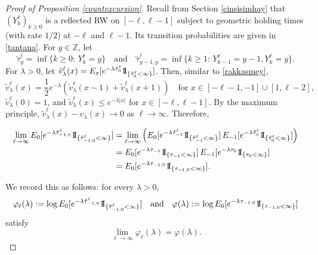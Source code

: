 \documentclass[a4paper]{amsart}
\numberwithin{equation}{section}
\theoremstyle{plain}
\theoremstyle{remark}
\begin{document}
\begin{proof}[Proof of Proposition \ref{countexcursion}]
	Recall from Section \ref{cinsisimhay} that $(Y_k^\ell)_{k\ge0}$ is a reflected RW on $[-\ell,\ell-1]$ subject to geometric holding times (with rate $1/2$) at $-\ell$ and $\ell-1$. Its transition probabilities are given in \eqref{tantana}. For $y\in\mathbb{Z}$, let
	$$\tilde\tau_y^\ell = \inf\{k\ge 0:\,Y_k^\ell = y\}\quad\text{and}\quad\tilde\tau_{y-1,y}^\ell = \inf\{k\ge1:\,Y_{k-1}^\ell = y-1, Y_k^\ell = y\}.$$
	For $\lambda > 0$, let $\tilde v_\lambda^\ell(x) = E_x[e^{-\lambda\tilde\tau_0^\ell}{{{\rm 1\mkern-1.5mu}\!{\rm I}}}_{\{\tilde\tau_{0}^\ell<\infty\}}]$. Then, similar to \eqref{rakkasmey},
	$$\tilde v_\lambda^\ell(x) = \frac1{2}e^{-\lambda}(\tilde v_\lambda^\ell(x-1) + \tilde v_\lambda^\ell(x+1))\quad\text{for $x\in[-\ell-1,-1]\cup[1,\ell-2]$,}$$
	$\tilde v_\lambda^\ell(0) = 1$, and $\tilde v_\lambda^\ell(x) \le e^{-\lambda|x|}$ for $x\in[-\ell,\ell-1]$.
	By the maximum principle, $\tilde v_\lambda^\ell(x) - v_\lambda(x)\to0$ as $\ell\to\infty$.
	Therefore,
	
	\begin{align*}
	\lim_{\ell\to\infty}E_0[e^{-\lambda\tilde\tau_{-1,0}^\ell}{{{\rm 1\mkern-1.5mu}\!{\rm I}}}_{\{\tilde\tau_{-1,0}^\ell<\infty\}}] &= \lim_{\ell\to\infty}\left(E_0[e^{-\lambda\tilde\tau_{-1}^\ell}{{{\rm 1\mkern-1.5mu}\!{\rm I}}}_{\{\tilde\tau_{-1}^\ell<\infty\}}]\,E_{-1}[e^{-\lambda\tilde\tau_{0}^\ell}{{{\rm 1\mkern-1.5mu}\!{\rm I}}}_{\{\tilde\tau_{0}^\ell<\infty\}}]\right)\\
	&= E_0[e^{-\lambda\tau_{-1}}{{{\rm 1\mkern-1.5mu}\!{\rm I}}}_{\{\tau_{-1}<\infty\}}]\,E_{-1}[e^{-\lambda\tau_{0}}{{{\rm 1\mkern-1.5mu}\!{\rm I}}}_{\{\tau_{0}<\infty\}}]\\
	&= E_0[e^{-\lambda\tau_{-1,0}}{{{\rm 1\mkern-1.5mu}\!{\rm I}}}_{\{\tau_{-1,0}<\infty\}}].
	\end{align*}
	
	We record this as follows: for every $\lambda>0$,
	$$\varphi_\ell(\lambda) := \log E_0[e^{-\lambda\tilde\tau_{-1,0}^\ell}{{{\rm 1\mkern-1.5mu}\!{\rm I}}}_{\{\tilde\tau_{-1,0}^\ell<\infty\}}]\quad\text{and}\quad\varphi(\lambda) := \log E_0[e^{-\lambda\tau_{-1,0}}{{{\rm 1\mkern-1.5mu}\!{\rm I}}}_{\{\tau_{-1,0}<\infty\}}]$$
	satisfy
	\begin{equation}\label{elher}
	\lim_{\ell\to\infty}\varphi_\ell(\lambda) = \varphi(\lambda).
	\end{equation}


\end{proof}
\end{document}
